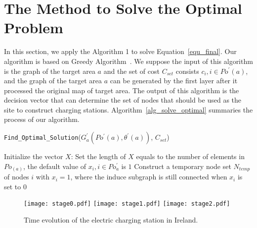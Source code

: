 \section{The Method to Solve the Optimal Problem}
\label{sec_solve_optimal}
In this section, we apply the Algorithm 1 to solve Equation~\ref{equ_final}.
Our algorithm is based on Greedy Algorithm~\cite{Greedy_Algorithm}.
We suppose the input of this algorithm is the graph of the target area $a$ and the set of cost $C_{set}$ consists $c_i, i \in Po^{'}(a)$,
and the graph of the target area $a$ can be generated by the first layer after it processed the original map of target area.
The output of this algorithm is the decision vector that can determine the set of nodes that should be used as the site to construct charging stations.
Algorithm~\ref{alg_solve_optimal} summaries the process of our algorithm.
\begin{algorithm}
\label{alg_solve_optimal}
\small
\caption{{\tt Find\_Optimal\_Solution}($G^{'}_{a}(Po^{'}(a),\theta^{'}(a))$, $C_{set}$)}
Initialize the vector $X$: Set the length of $X$ equals to the number of elements in $Po_(a)$, the default value of $x_i, i \in Po^{'}_{a}$ is $1$\;
Construct a temporary node set $N_{temp}$of nodes $i$ with $x_i = 1$,
where the induce subgraph is still connected when $x_i$ is set to 0\;
\;
\end{algorithm}
\begin{figure}[h]
\centering
\texttt{[image: stage0.pdf]}
\texttt{[image: stage1.pdf]}
\texttt{[image: stage2.pdf]}
\caption{Time evolution of the electric charging station in Ireland.}
\label{fig_stages}
\end{figure}

